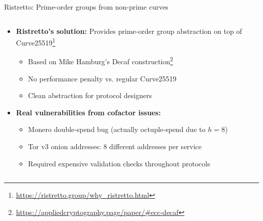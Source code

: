 \documentclass[aspectratio=169, lualatex, handout]{beamer}
\begin{document}
\begin{frame}{Ristretto: Prime-order groups from non-prime curves}
	\begin{columns}[c]
		\begin{column}{1\textwidth}
			\begin{itemize}
				\item \textbf{Ristretto's solution:} Provides prime-order group abstraction on top of Curve25519\footnote{\url{https://ristretto.group/why_ristretto.html}}
				      \begin{itemize}
					      \item Based on Mike Hamburg's Decaf construction\footnote{\url{https://appliedcryptography.page/paper/\#ecc-decaf}}
					      \item No performance penalty vs. regular Curve25519
					      \item Clean abstraction for protocol designers
				      \end{itemize}
				\item \textbf{Real vulnerabilities from cofactor issues:}
				      \begin{itemize}
					      \item Monero double-spend bug (actually octuple-spend due to $h=8$)
					      \item Tor v3 onion addresses: 8 different addresses per service
					      \item Required expensive validation checks throughout protocols
				      \end{itemize}
			\end{itemize}
		\end{column}
	\end{columns}
\end{frame}
\end{document}
